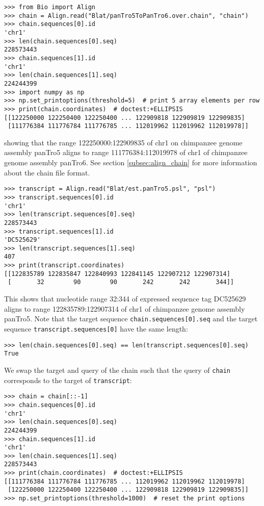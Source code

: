 \begin{verbatim}
>>> from Bio import Align
>>> chain = Align.read("Blat/panTro5ToPanTro6.over.chain", "chain")
>>> chain.sequences[0].id
'chr1'
>>> len(chain.sequences[0].seq)
228573443
>>> chain.sequences[1].id
'chr1'
>>> len(chain.sequences[1].seq)
224244399
>>> import numpy as np
>>> np.set_printoptions(threshold=5)  # print 5 array elements per row
>>> print(chain.coordinates)  # doctest:+ELLIPSIS
[[122250000 122250400 122250400 ... 122909818 122909819 122909835]
 [111776384 111776784 111776785 ... 112019962 112019962 112019978]]
\end{verbatim}
showing that the range 122250000:122909835 of chr1 on chimpanzee genome assembly panTro5 aligns to range 111776384:112019978 of chr1 of chimpanzee genome assembly panTro6. See section \ref{subsec:align_chain} for more information about the chain file format.
\begin{verbatim}
>>> transcript = Align.read("Blat/est.panTro5.psl", "psl")
>>> transcript.sequences[0].id
'chr1'
>>> len(transcript.sequences[0].seq)
228573443
>>> transcript.sequences[1].id
'DC525629'
>>> len(transcript.sequences[1].seq)
407
>>> print(transcript.coordinates)
[[122835789 122835847 122840993 122841145 122907212 122907314]
 [       32        90        90       242       242       344]]
\end{verbatim}
This shows that nucleotide range 32:344 of expressed sequence tag DC525629
aligns to range 122835789:122907314 of chr1 of chimpanzee genome assembly
panTro5.  Note that the target sequence \verb|chain.sequences[0].seq| and the target sequence \verb|transcript.sequences[0]| have the same length:
\begin{verbatim}
>>> len(chain.sequences[0].seq) == len(transcript.sequences[0].seq)
True
\end{verbatim}
We swap the target and query of the chain such that the query of \verb|chain| corresponds to the target of \verb|transcript|:
\begin{verbatim}
>>> chain = chain[::-1]
>>> chain.sequences[0].id
'chr1'
>>> len(chain.sequences[0].seq)
224244399
>>> chain.sequences[1].id
'chr1'
>>> len(chain.sequences[1].seq)
228573443
>>> print(chain.coordinates)  # doctest:+ELLIPSIS
[[111776384 111776784 111776785 ... 112019962 112019962 112019978]
 [122250000 122250400 122250400 ... 122909818 122909819 122909835]]
>>> np.set_printoptions(threshold=1000)  # reset the print options
\end{verbatim}
